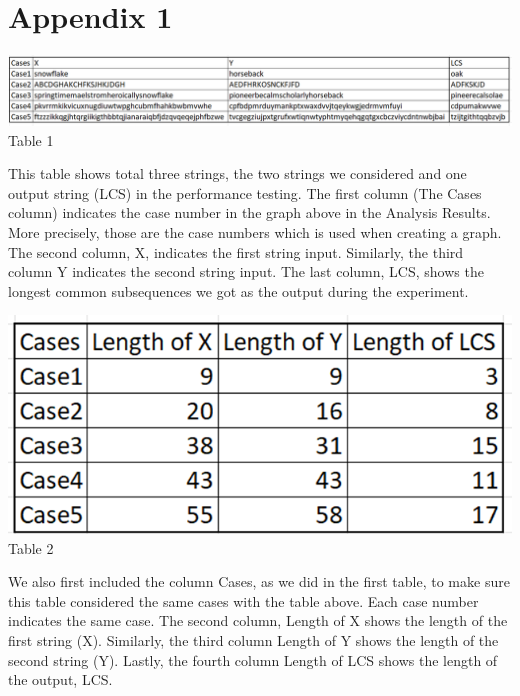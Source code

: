 \documentclass{article}
\begin{document}
\section{\textbf{Appendix 1}} 
\begin{center}
\includegraphics[scale = 0.4]{table1} \\
\scriptsize{Table 1}
\end{center}
\indent This table shows total three strings, the two strings we considered and one output string (LCS) in the performance testing. The first column (The Cases column) indicates the case number in the graph above in the Analysis Results. More precisely, those are the case numbers which is used when creating a graph. The second column, X, indicates the first string input. Similarly, the third column Y indicates the second string input. The last column, LCS, shows the longest common subsequences we got as the output during the experiment. 

\begin{center}
\includegraphics[scale = 0.4]{table2} \\
\scriptsize{Table 2}
\end{center}
\indent We also first included the column Cases, as we did in the first table, to make sure this table considered the same cases with the table above. Each case number indicates the same case. The second column, Length of X shows the length of the first string (X). Similarly, the third column Length of Y shows the length of the second string (Y). Lastly, the fourth column Length of LCS shows the length of the output, LCS.
\end{document}
